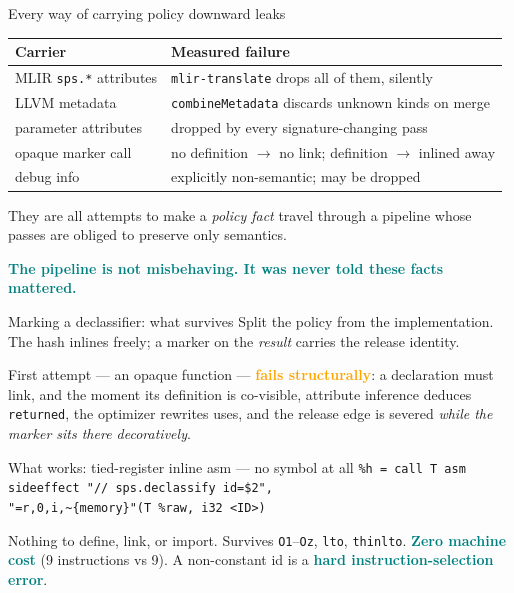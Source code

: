 \documentclass[aspectratio=169,10pt]{beamer}
\newcommand{\good}[1]{\textcolor{Teal}{\textbf{#1}}}
\newcommand{\bad}[1]{\textcolor{Orange}{\textbf{#1}}}
\newcommand{\code}[1]{\texttt{#1}}
\newcommand{\vs}{\textcolor{Muted}{$\rightarrow$}}
\begin{document}
\begin{frame}{Every way of carrying policy downward leaks}
  \begin{center}
  \begin{tabular}{@{}l l@{}}
  \toprule
  Carrier & Measured failure \\
  \midrule
  MLIR \code{sps.*} attributes & \code{mlir-translate} drops all of them, silently \\
  LLVM metadata                & \code{combineMetadata} discards unknown kinds on merge \\
  parameter attributes         & dropped by every signature-changing pass \\
  opaque marker call           & no definition \vs{} no link; definition \vs{} inlined away \\
  debug info                   & explicitly non-semantic; may be dropped \\
  \bottomrule
  \end{tabular}
  \end{center}

  \vspace{0.8em}
  They are all attempts to make a \emph{policy fact} travel through a pipeline
  whose passes are obliged to preserve only semantics.

  \vspace{0.5em}
  \good{The pipeline is not misbehaving. It was never told these facts mattered.}
\end{frame}

\begin{frame}{Marking a declassifier: what survives}
  Split the policy from the implementation. The hash inlines freely; a marker on
  the \emph{result} carries the release identity.

  \vspace{0.6em}
  First attempt --- an opaque function --- \bad{fails structurally}:
  a declaration must link, and the moment its definition is co-visible,
  attribute inference deduces \code{returned}, the optimizer rewrites uses,
  and the release edge is severed \emph{while the marker sits there decoratively}.

  \begin{block}{What works: tied-register inline asm --- no symbol at all}
  \code{\%h = call T asm sideeffect "// sps.declassify id=\$2",}\\
  \hspace*{2.2em}\code{"=r,0,i,\textasciitilde\{memory\}"(T \%raw, i32 <ID>)}
  \end{block}

  \vspace{0.4em}
  Nothing to define, link, or import. Survives \code{O1}--\code{Oz}, \code{lto},
  \code{thinlto}. \good{Zero machine cost} (9 instructions vs 9). A non-constant
  id is a \good{hard instruction-selection error}.
\end{frame}
\end{document}
